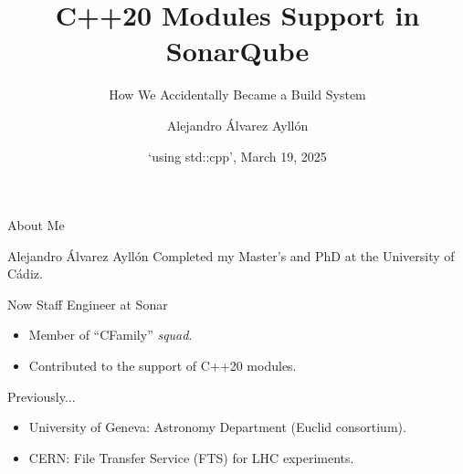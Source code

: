 \documentclass[]{beamer}
\title{C++20 Modules Support in SonarQube}
\subtitle{How We Accidentally Became a Build System}
\date{`using std::cpp', March 19, 2025}
\author{Alejandro Álvarez Ayllón}
\begin{document}
\begin{frame}[standout]
  \titlepage
\end{frame}

\begin{frame}{About Me}
  \begin{block}{Alejandro Álvarez Ayllón }
    Completed my Master's and PhD at the University of Cádiz.
  \end{block}
  \begin{block}{Now Staff Engineer at Sonar}
    \begin{itemize}
      \item Member of ``CFamily'' \textit{squad}.
      \item Contributed to the support of C++20 modules.
    \end{itemize}
  \end{block}

  \begin{block}{Previously...}
    \begin{itemize}
      \item University of Geneva: Astronomy Department (Euclid consortium).
      \item CERN: File Transfer Service (FTS) for LHC experiments.
    \end{itemize}
  \end{block}
\end{frame}
\end{document}
